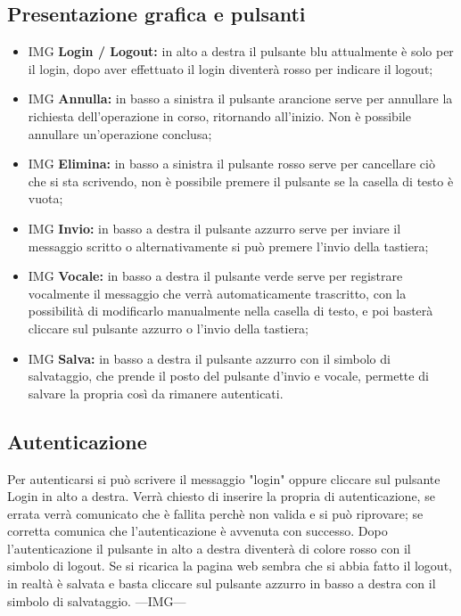 \subsection{Presentazione grafica e pulsanti}
\begin{itemize}
    \item IMG \textbf{Login / Logout:} in alto a destra il pulsante blu attualmente è solo per il login, dopo aver effettuato il login diventerà rosso per indicare il logout;
    \item IMG \textbf{Annulla:} in basso a sinistra il pulsante arancione serve per annullare la richiesta dell'operazione in corso, ritornando all'inizio. Non è possibile annullare un'operazione conclusa;
    \item IMG \textbf{Elimina:} in basso a sinistra il pulsante rosso serve per cancellare ciò che si sta scrivendo, non è possibile premere il pulsante se la casella di testo è vuota;
    \item IMG \textbf{Invio:} in basso a destra il pulsante azzurro serve per inviare il messaggio scritto o alternativamente si può premere l'invio della tastiera;
    \item IMG \textbf{Vocale:} in basso a destra il pulsante verde serve per registrare vocalmente il messaggio che verrà automaticamente trascritto, con la possibilità di modificarlo manualmente nella casella di testo, e poi basterà cliccare sul pulsante azzurro o l'invio della tastiera; 
    \item IMG \textbf{Salva:} in basso a destra il pulsante azzurro con il simbolo di salvataggio, che prende il posto del pulsante d'invio e vocale, permette di salvare la propria  così da rimanere autenticati.
\end{itemize}
\subsection{Autenticazione}
Per autenticarsi si può scrivere il messaggio "login" oppure cliccare sul pulsante Login in alto a destra. Verrà chiesto di inserire la propria  di autenticazione, se errata verrà comunicato che è fallita perchè non valida e si può riprovare; se corretta comunica che l'autenticazione è avvenuta con successo. 
Dopo l'autenticazione il pulsante in alto a destra diventerà di colore rosso con il simbolo di logout.
Se si ricarica la pagina web sembra che si abbia fatto il logout, in realtà  è salvata e basta cliccare sul pulsante azzurro in basso a destra con il simbolo di salvataggio.
---IMG--- \newline

\newpage